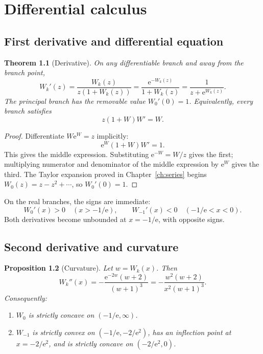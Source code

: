 \documentclass[11pt,oneside]{book}
\newtheorem{theorem}{Theorem}[chapter]
\newtheorem{proposition}[theorem]{Proposition}
\theoremstyle{definition}
\theoremstyle{remark}
\newcommand{\ee}{\mathrm e}
\begin{document}
\chapter{Differential calculus}\label{ch:calculus}

\section{First derivative and differential equation}

\begin{theorem}[Derivative]\label{thm:derivative}
On any differentiable branch and away from the branch point,
\begin{equation}\label{eq:Wprime}
 W_k'(z)=\frac{W_k(z)}{z(1+W_k(z))}
        =\frac{\ee^{-W_k(z)}}{1+W_k(z)}
        =\frac{1}{z+\ee^{W_k(z)}}.
\end{equation}
The principal branch has the removable value $W_0'(0)=1$.
Equivalently, every branch satisfies
\begin{equation}\label{eq:Wode}
 z(1+W)W'=W.
\end{equation}
\end{theorem}

\begin{proof}
Differentiate $W\ee^W=z$ implicitly:
\[
 \ee^W(1+W)W'=1.
\]
This gives the middle expression.  Substituting
$\ee^{-W}=W/z$ gives the first; multiplying numerator and denominator of the
middle expression by $\ee^W$ gives the third.  The Taylor expansion proved in
Chapter~\ref{ch:series} begins $W_0(z)=z-z^2+\cdots$, so $W_0'(0)=1$.
\end{proof}

On the real branches, the signs are immediate:
\[
 W_0'(x)>0\quad(x>-1/\ee),
 \qquad
 W_{-1}'(x)<0\quad(-1/\ee<x<0).
\]
Both derivatives become unbounded at $x=-1/\ee$, with opposite signs.

\section{Second derivative and curvature}

\begin{proposition}[Curvature]\label{prop:curvature}
Let $w=W_k(x)$.  Then
\begin{equation}\label{eq:Wsecond}
 W_k''(x)=-\frac{\ee^{-2w}(w+2)}{(w+1)^3}
 =-\frac{w^2(w+2)}{x^2(w+1)^3}.
\end{equation}
Consequently:
\begin{enumerate}[label=\textup{(\roman*)}]
\item $W_0$ is strictly concave on $(-1/\ee,\infty)$.
\item $W_{-1}$ is strictly convex on $(-1/\ee,-2/\ee^2)$, has an inflection
point at $x=-2/\ee^2$, and is strictly concave on $(-2/\ee^2,0)$.
\end{enumerate}
\end{proposition}
\end{document}
